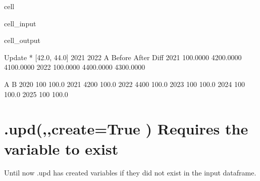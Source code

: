 \documentclass[letterpaper,10pt,english]{jupyterBook}
\begin{document}
\begin{sphinxuseclass}{cell}\begin{sphinxVerbatimInput}

\begin{sphinxuseclass}{cell_input}
\begin{sphinxVerbatim}[commandchars=\\\{\}]
\end{sphinxVerbatim}

\end{sphinxuseclass}\end{sphinxVerbatimInput}
\begin{sphinxVerbatimOutput}

\begin{sphinxuseclass}{cell_output}
\begin{sphinxVerbatim}[commandchars=\\\{\}]
Update * [42.0, 44.0] 2021 2022
A                    Before                After                 Diff
2021               100.0000            4200.0000            4100.0000
2022               100.0000            4400.0000            4300.0000
\end{sphinxVerbatim}

\begin{sphinxVerbatim}[commandchars=\\\{\}]
         A      B
2020   100  100.0
2021  4200  100.0
2022  4400  100.0
2023   100  100.0
2024   100  100.0
2025   100  100.0
\end{sphinxVerbatim}

\end{sphinxuseclass}\end{sphinxVerbatimOutput}

\end{sphinxuseclass}

\section{.upd(,,create=True ) Requires the variable to exist}
\label{\detokenize{content/howto/update/model update:upd-create-true-requires-the-variable-to-exist}}
\sphinxAtStartPar
Until now .upd has created variables if they did not exist in the input dataframe.
\end{document}
